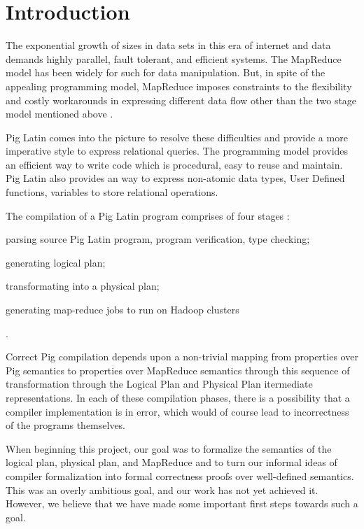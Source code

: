 \section{Introduction}
\label{sec:intro}

{\bf}

The exponential growth of sizes in data sets in this era of internet and data demands highly parallel, fault tolerant, and efficient systems. The MapReduce model \cite{dean2004mapreduce} \cite{dean2010mapreduce} has been widely for such for data manipulation. But, in spite of the appealing programming model, MapReduce imposes constraints to the flexibility and costly workarounds in expressing different data flow other than the two stage model mentioned above \cite{olston2008pig}.

Pig Latin comes into the picture to resolve these difficulties and provide a more imperative style to express relational queries. The programming model provides an efficient way to write code which is procedural, easy to reuse and maintain. Pig Latin also provides an way to express non-atomic data types, User Defined functions, variables to store relational operations.

The compilation of a Pig Latin program comprises of four stages \cite{gates2009building}: \begin{enumerate*}[label=\itshape\alph*\upshape)] \item parsing source Pig Latin program, program verification, type checking; \item generating logical plan; \item transformating into a physical plan; \item generating map-reduce jobs to run on Hadoop clusters \end{enumerate*}.

Correct Pig compilation depends upon a non-trivial mapping from properties over Pig semantics to properties over MapReduce semantics through this sequence of transformation through the Logical Plan and Physical Plan itermediate representations. In each of these compilation phases, there is a possibility that a compiler implementation is in error, which would of course lead to incorrectness of the programs themselves.

When beginning this project, our goal was to formalize the semantics of the logical plan, physical plan, and MapReduce and to turn our informal ideas of compiler formalization into formal correctness proofs over well-defined semantics. This was an overly ambitious goal, and our work has not yet achieved it. However, we believe that we have made some important first steps
towards such a goal.

